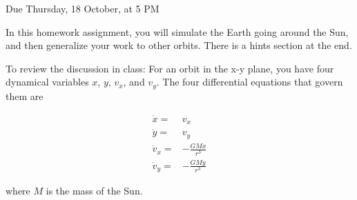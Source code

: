 \documentclass[12pt]{article}
\begin{document}
\Large
\centerline{}
\centerline{Due Thursday, 18 October, at 5 PM}
\normalsize

In this homework assignment, you will simulate the Earth going around the Sun,
and then generalize your work to other orbits. There is a hints section at the end.

To review the discussion in class: 
For an orbit in the x-y plane, you have four dynamical variables $x$, $y$,
$v_x$, and $v_y$. The four differential equations that govern them are

\begin{align}
\dot x =& v_x\\
\dot y =& v_y\\
\dot v_x =& -\frac{GMx}{r^3} \\
\dot v_y =& -\frac{GMy}{r^3} 
\end{align}

where $M$ is the mass of the Sun.
\end{document}
